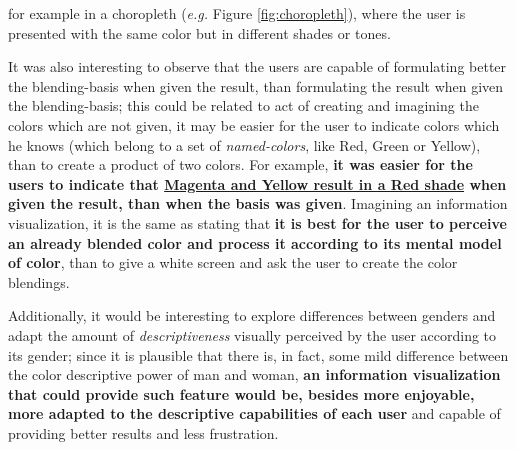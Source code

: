 for example in a choropleth (\emph{e.g.} Figure \ref{fig:choropleth}), where the user is presented with the same color but in different shades or tones. \par
%
It was also interesting to observe that the users are capable of formulating better the blending-basis when given the result, than formulating the result
when given the blending-basis; this could be related to act of creating and imagining the colors which are not given, it may be easier for the user to
indicate colors which he knows (which belong to a set of \emph{named-colors}, like Red, Green or Yellow), than to create a product of two colors. For
example, \textbf{it was easier for the users to indicate that \ul{Magenta and Yellow result in a Red shade} when given the result, than when the basis
was given}. Imagining an information visualization, it is the same as stating that \textbf{it is best for the user to perceive an already blended color
and process it according to its mental model of color}, than to give a white screen and ask the user to create the color blendings. \par
%
Additionally, it would be interesting to explore differences between genders and adapt the amount of \emph{descriptiveness} visually
perceived by the user according to its gender; since it is plausible that there is, in fact, some mild difference between the color descriptive power of
man and woman, \textbf{an information visualization that could provide such feature would be, besides more enjoyable, more adapted to the descriptive
capabilities of each user} and capable of providing better results and less frustration.
%
